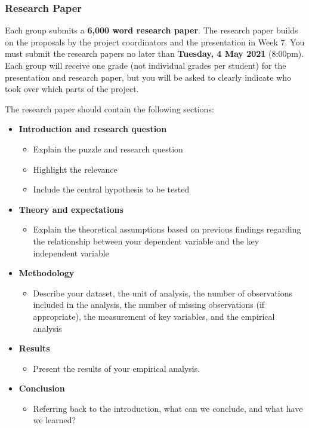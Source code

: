 \documentclass[abstract=on,parskip=full,headings=standardclasses,fontsize=11pt,paper=a4]{scrartcl}
\begin{document}
\subsubsection*{Research Paper}

 Each group submits a \textbf{6,000 word research paper}. The research paper builds on the proposals by the project coordinators and the presentation in Week 7. You  must submit the research papers no later than \textbf{Tuesday, 4 May 2021} (8:00pm). Each group will receive one grade (not individual grades per student) for the presentation and research paper, but you will be asked to clearly indicate who took over which parts of the project. 
 
 

The research paper should contain the following sections:
\begin{itemize}
\item \textbf{Introduction and research question} 
\begin{itemize}
\item Explain the puzzle and research question
\item Highlight the relevance
\item Include the central hypothesis to be tested
\end{itemize}
\item \textbf{Theory and expectations} 
\begin{itemize}
\item Explain the theoretical assumptions based on previous findings regarding the  relationship between your dependent variable and the key independent variable
\end{itemize}
\item \textbf{Methodology} 
\begin{itemize}
\item Describe your dataset, the unit of analysis, the number of observations included in the analysis, the number of missing observations (if appropriate), the measurement of key variables, and the empirical analysis
\end{itemize}
\item \textbf{Results}
\begin{itemize}
\item Present the results of your empirical analysis.
\end{itemize}
\item \textbf{Conclusion}
\begin{itemize}
\item Referring back to the introduction, what can we conclude, and what have we learned?
\end{itemize}
\end{itemize}
\end{document}
